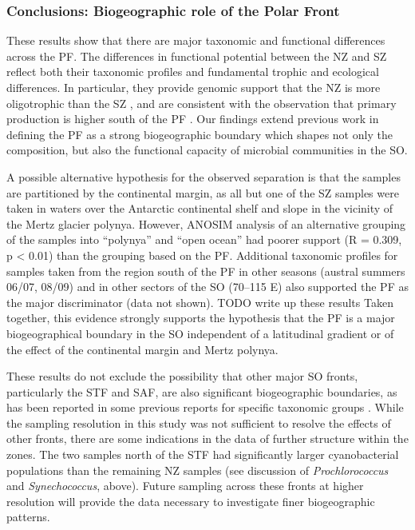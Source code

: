 \subsubsection{Conclusions: Biogeographic role of the Polar Front}

These results show that there are major taxonomic and functional differences across the \ac{PF}.
The differences in functional potential between the \ac{NZ} and \ac{SZ} reflect both their taxonomic profiles and fundamental trophic and ecological differences.
In particular, they provide genomic support that the \ac{NZ} is more oligotrophic than the \ac{SZ} \cite{Pollard:2002vr,Giovannoni:2005ib,Alonso:2006dj,Lauro:2009gx}, and are consistent with the observation that primary production is higher south of the \ac{PF} \cite{Strutton:2000ta,Williams:2010jy}.
Our findings extend previous work in defining the \ac{PF} as a strong biogeographic boundary which shapes not only the composition, but also the functional capacity of microbial communities in the \ac{SO}.

A possible alternative hypothesis for the observed separation is that the samples are partitioned by the continental margin, as all but one of the \ac{SZ} samples were taken in waters over the Antarctic continental shelf and slope in the vicinity of the Mertz glacier polynya.
However, \ac{ANOSIM} analysis of an alternative grouping of the samples into ``polynya'' and ``open ocean'' had poorer support (R = 0.309, p < 0.01) than the grouping based on the \ac{PF}.
Additional taxonomic profiles for samples taken from the region south of the \ac{PF} in other seasons (austral summers 06/07, 08/09) and in other sectors of the \ac{SO} (70--115\textdegree{} E) also supported the \ac{PF} as the major discriminator (data not shown).
TODO write up these results
Taken together, this evidence strongly supports the hypothesis that the \ac{PF} is a major biogeographical boundary in the \ac{SO} independent of a latitudinal gradient or of the effect of the continental margin and Mertz polynya.

These results do not exclude the possibility that other major \ac{SO} fronts, particularly the \ac{STF} and \ac{SAF}, are also significant biogeographic boundaries, as has been reported in some previous reports for specific taxonomic groups \citep[e.g.][]{Abell:2005ji}.
While the sampling resolution in this study was not sufficient to resolve the effects of other fronts, there are some indications in the data of further structure within the zones.
The two samples north of the \ac{STF} had significantly larger cyanobacterial populations than the remaining \ac{NZ} samples (see discussion of \emph{Prochlorococcus} and \emph{Synechococcus}, above).
Future sampling across these fronts at higher resolution will provide the data necessary to investigate finer biogeographic patterns.

